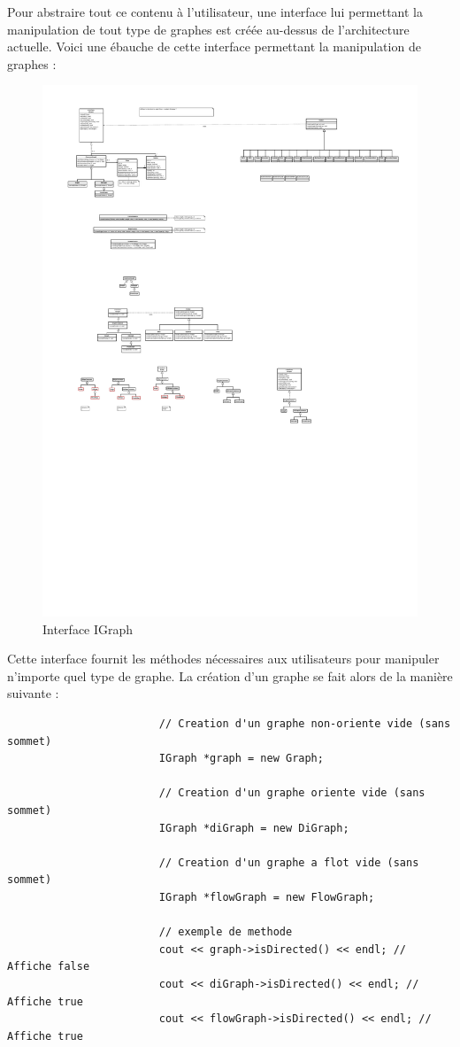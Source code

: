 \documentclass[french]{article}
\begin{document}
			Pour abstraire tout ce contenu à l'utilisateur, une interface lui permettant la manipulation de tout type de graphes est créée au-dessus de l'architecture actuelle.
			Voici une ébauche de cette interface permettant la manipulation de graphes :
			\begin{figure}[H]
				\centering
				\includegraphics[scale=4.0]{Conception/graph/classGraph.pdf}
				\caption{Interface IGraph}
			\end{figure}
			Cette interface fournit les méthodes nécessaires aux utilisateurs pour manipuler n'importe quel type de graphe. La création d'un graphe se fait alors de la manière suivante :\\
			\begin{lstlisting}
						// Creation d'un graphe non-oriente vide (sans sommet)
						IGraph *graph = new Graph;
						
						// Creation d'un graphe oriente vide (sans sommet)
						IGraph *diGraph = new DiGraph;
						
						// Creation d'un graphe a flot vide (sans sommet)
						IGraph *flowGraph = new FlowGraph;
						
						// exemple de methode
						cout << graph->isDirected() << endl; // Affiche false
						cout << diGraph->isDirected() << endl; // Affiche true
						cout << flowGraph->isDirected() << endl; // Affiche true
			\end{lstlisting}
			
\end{document}
